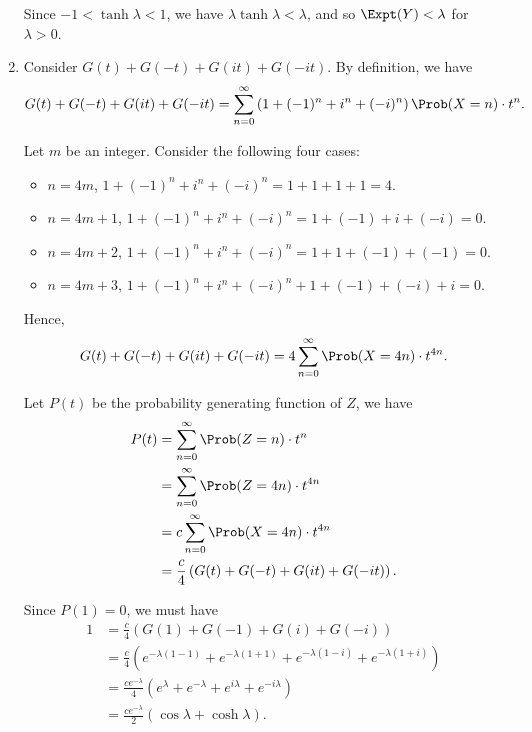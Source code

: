 \begin{enumerate}
          Since \(-1 < \tanh \lambda < 1\), we have \(\lambda \tanh \lambda < \lambda\), and so \(\Expt(Y) < \lambda\) for \(\lambda > 0\).

    \item Consider \(G(t) + G(-t) + G(it) + G(-it)\). By definition, we have
          \[
              G(t) + G(-t) + G(it) + G(-it) = \sum_{n = 0}^{\infty} \left(1 + (-1)^n + i^n + (-i)^n\right) \Prob(X = n) \cdot t^n.
          \]

          Let \(m\) be an integer. Consider the following four cases:
          \begin{itemize}
              \item \(n = 4m\), \(1 + (-1)^n + i^n + (-i)^n = 1 + 1 + 1 + 1 = 4\).
              \item \(n = 4m + 1\), \(1 + (-1)^n + i^n + (-i)^n = 1 + (-1) + i + (-i) = 0\).
              \item \(n = 4m + 2\), \(1 + (-1)^n + i^n + (-i)^n = 1 + 1 + (-1) + (-1) = 0\).
              \item \(n = 4m + 3\), \(1 + (-1)^n + i^n + (-i)^n + 1 + (-1) + (-i) + i = 0\).
          \end{itemize}

          Hence,
          \[
              G(t) + G(-t) + G(it) + G(-it) = 4 \sum_{n = 0}^{\infty} \Prob(X = 4n) \cdot t^{4n}.
          \]

          Let \(P(t)\) be the probability generating function of \(Z\), we have
          \begin{align*}
              P(t) & = \sum_{n = 0}^{\infty} \Prob(Z = n) \cdot t^n            \\
                   & = \sum_{n = 0}^{\infty} \Prob(Z = 4n) \cdot t^{4n}        \\
                   & = c \sum_{n = 0}^{\infty} \Prob(X = 4n) \cdot t^{4n}      \\
                   & = \frac{c}{4} \left(G(t) + G(-t) + G(it) + G(-it)\right).
          \end{align*}

          Since \(P(1) = 0\), we must have
          \begin{align*}
              1 & = \frac{c}{4} \left(G(1) + G(-1) + G(i) + G(-i)\right)                                                               \\
                & = \frac{c}{4} \left(e^{-\lambda (1 - 1)} + e^{-\lambda (1 + 1)} + e^{-\lambda (1 - i)} + e^{-\lambda (1 + i)}\right) \\
                & = \frac{ce^{-\lambda}}{4} \left(e^{\lambda} + e^{-\lambda} + e^{i\lambda} + e^{-i\lambda}\right)                     \\
                & = \frac{c e^{-\lambda}}{2} \left(\cos \lambda + \cosh \lambda\right).
          \end{align*}


\end{enumerate}

